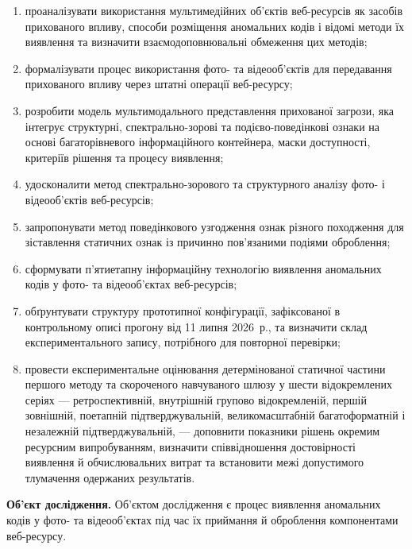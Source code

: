 \begin{enumerate}[label=\arabic*)]
\item проаналізувати використання мультимедійних об’єктів веб-ресурсів як засобів прихованого впливу, способи розміщення аномальних кодів і відомі методи їх виявлення та визначити взаємодоповнювальні обмеження цих методів;

\item формалізувати процес використання фото- та відеооб’єктів для передавання прихованого впливу через штатні операції веб-ресурсу;

\item розробити модель мультимодального представлення прихованої загрози, яка інтегрує структурні, спектрально-зорові та подієво-поведінкові ознаки на основі багаторівневого інформаційного контейнера, маски доступності, критеріїв рішення та процесу виявлення;

\item удосконалити метод спектрально-зорового та структурного аналізу фото- і відеооб’єктів веб-ресурсів;

\item запропонувати метод поведінкового узгодження ознак різного походження для зіставлення статичних ознак із причинно пов’язаними подіями оброблення;

\item сформувати п’ятиетапну інформаційну технологію виявлення аномальних кодів у фото- та відеооб’єктах веб-ресурсів;

\item обґрунтувати структуру прототипної конфігурації, зафіксованої в контрольному описі прогону від 11 липня 2026~р., та визначити склад експериментального запису, потрібного для повторної перевірки;

\item провести експериментальне оцінювання детермінованої статичної частини першого методу та скороченого навчуваного шлюзу у шести відокремлених серіях --- ретроспективній, внутрішній групово відокремленій, першій зовнішній, поетапній підтверджувальній, великомасштабній багатоформатній і незалежній підтверджувальній, --- доповнити показники рішень окремим ресурсним випробуванням, визначити співвідношення достовірності виявлення й обчислювальних витрат та встановити межі допустимого тлумачення одержаних результатів.
\end{enumerate}

\textbf{Об’єкт дослідження.}
Об’єктом дослідження є процес виявлення аномальних кодів у фото- та відеооб’єктах під час їх приймання й оброблення компонентами веб-ресурсу.

